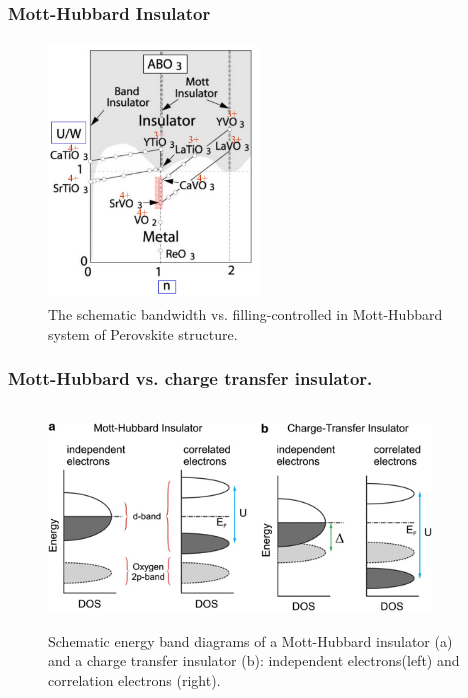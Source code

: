 {\frame
{
	\frametitle{\textrm{Mott-Hubbard Insulator}}
\begin{figure}[h!]
\centering
\vspace*{-0.20in}
\includegraphics[height=2.70in,width=2.2in,viewport=0 0 660 840,clip]{Figures/Band-Mott_Hubard-Insulator.jpeg}
\caption{\tiny \textrm{The schematic bandwidth vs. filling-controlled in Mott-Hubbard system of Perovskite structure.}}%
\label{Bandwidth-Mott_Hubard-Insulator}
\end{figure}
}

\frame
{
	\frametitle{\textrm{Mott-Hubbard vs. charge transfer insulator.}}
\begin{figure}[h!]
\centering
\vspace*{-0.10in}
\includegraphics[height=2.30in,width=4.0in,viewport=0 0 320 170,clip]{Figures/Schematic-energy-band-diagrams-of-a-Mott-Hubbard-insulator-and-a-charge-transfer-insulator-independent_left-correlation_right.jpg}
\caption{\tiny \textrm{Schematic energy band diagrams of a Mott-Hubbard insulator (a) and a charge transfer insulator (b): independent electrons(left)  and correlation electrons (right).}}%
\label{Band-Mott_Hubard_vs_charge-Insulator}
\end{figure}
}

}

